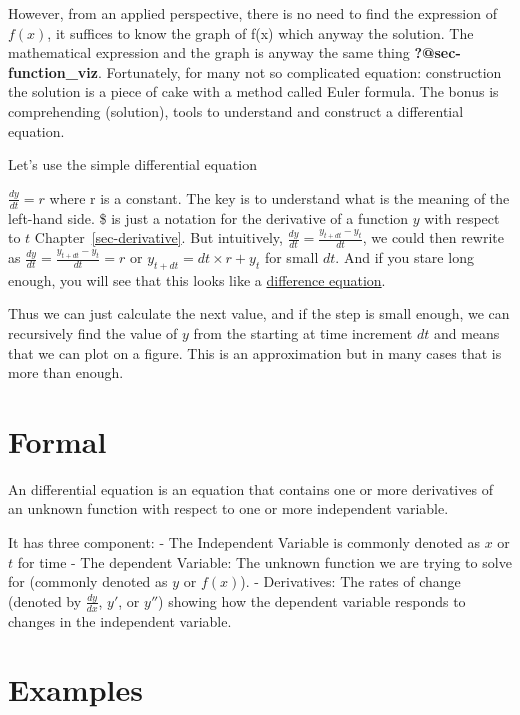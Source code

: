 \documentclass[
  letterpaper,
  DIV=11,
  numbers=noendperiod]{scrreprt}
\begin{document}
However, from an applied perspective, there is no need to find the
expression of \(f(x)\), it suffices to know the graph of f(x) which
anyway the solution. The mathematical expression and the graph is anyway
the same thing \textbf{?@sec-function\_viz}. Fortunately, for many not
so complicated equation: construction the solution is a piece of cake
with a method called Euler formula. The bonus is comprehending
(solution), tools to understand and construct a differential equation.

Let's use the simple differential equation

\(\frac{dy}{dt} = r\) where r is a constant. The key is to understand
what is the meaning of the left-hand side. \$ is just a
notation for the derivative of a function \(y\) with respect to \(t\)
Chapter~\ref{sec-derivative}. But intuitively,
\(\frac{dy}{dt} = \frac{y_{t+dt} - y_t}{dt}\), we could then rewrite as
\(\frac{dy}{dt} = \frac{y_{t+dt} - y_t}{dt} = r\) or
\(y_{t+dt} =  dt \times r + y_t\) for small \(dt\). And if you stare
long enough, you will see that this looks like a
\href{@sec-difference}{difference equation}.

Thus we can just calculate the next value, and if the step is small
enough, we can recursively find the value of \(y\) from the starting at
time increment \(dt\) and means that we can plot on a figure. This is an
approximation but in many cases that is more than enough.

\section*{Formal}\label{formal-13}


An differential equation is an equation that contains one or more
derivatives of an unknown function with respect to one or more
independent variable.

It has three component: - The Independent Variable is commonly denoted
as \(x\) or \(t\) for time - The dependent Variable: The unknown
function we are trying to solve for (commonly denoted as \(y\) or
\(f(x)\)). - Derivatives: The rates of change (denoted by
\(\frac{dy}{dx}\), \(y'\), or \(y''\)) showing how the dependent
variable responds to changes in the independent variable.

\section*{Examples}\label{examples-12}
\end{document}
